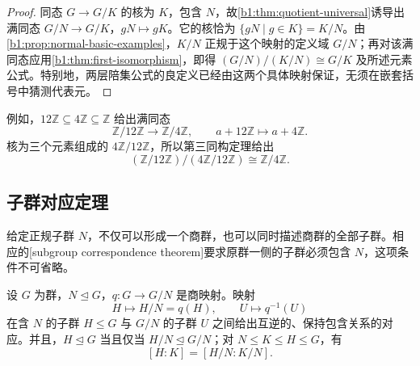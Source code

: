\begin{proof}
	同态 \(G\rightarrow G/K\) 的核为 \(K\)，包含 \(N\)，故\cref{b1:thm:quotient-universal}诱导出满同态 \(G/N\rightarrow G/K\)，\(gN\mapsto gK\)。它的核恰为 \(\{gN\mid g\in K\}=K/N\)。由\cref{b1:prop:normal-basic-examples}，\(K/N\) 正规于这个映射的定义域 \(G/N\)；再对该满同态应用\cref{b1:thm:first-isomorphism}，即得 \((G/N)/(K/N)\cong G/K\) 及所述元素公式。特别地，两层陪集公式的良定义已经由这两个具体映射保证，无须在嵌套括号中猜测代表元。
\end{proof}

例如，\(12\mathbb Z\subseteq4\mathbb Z\subseteq\mathbb Z\) 给出满同态
\[
	\mathbb Z/12\mathbb Z\longrightarrow\mathbb Z/4\mathbb Z, \qquad a+12\mathbb Z\longmapsto a+4\mathbb Z.
\]
核为三个元素组成的 \(4\mathbb Z/12\mathbb Z\)，所以第三同构定理给出
\[
	(\mathbb Z/12\mathbb Z)/(4\mathbb Z/12\mathbb Z) \cong\mathbb Z/4\mathbb Z.
\]

\subsection{子群对应定理}
\label{b1:subsec:0204:02}

给定正规子群 \(N\)，不仅可以形成一个商群，也可以同时描述商群的全部子群。相应的[subgroup correspondence theorem]要求原群一侧的子群必须包含 \(N\)，这项条件不可省略。

\begin{theorem}[子群对应]\label{b1:thm:subgroup-correspondence}
	设 \(G\) 为群，\(N\trianglelefteq G\)，\(q:G\rightarrow G/N\) 是商映射。映射
	\[
		H\longmapsto H/N=q(H),\qquad U\longmapsto q^{-1}(U)
	\]
	在含 \(N\) 的子群 \(H\leq G\) 与 \(G/N\) 的子群 \(U\) 之间给出互逆的、保持包含关系的对应。并且，\(H\trianglelefteq G\) 当且仅当 \(H/N\trianglelefteq G/N\)；对 \(N\leq K\leq H\leq G\)，有
	\[
		[H:K]=[H/N:K/N].
	\]
\end{theorem}

